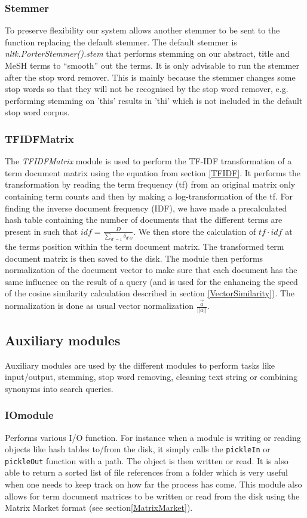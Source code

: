 \subsubsection{Stemmer}
To preserve flexibility our system allows another stemmer to be sent
to the function replacing the default stemmer. The default stemmer is
\textit{nltk.PorterStemmer().stem} that performs stemming on our
abstract, title and MeSH terms to ``smooth'' out the terms. It is only
advisable to run the stemmer after the stop word remover. This is
mainly because the stemmer changes some stop words so that they will
not be recognised by the stop word remover, e.g. performing stemming
on 'this' results in 'thi' which is not included in the default stop
word corpus.

\subsubsection{TFIDFMatrix}
The \textit{TFIDFMatrix} module is used to perform the TF-IDF
transformation of a term document matrix using the equation from
section \ref{TFIDF}. It performs the transformation by reading the
term frequency (tf) from an original matrix only containing term
counts and then by making a log-transformation of the tf. For finding
the inverse document frequency (IDF), we have made a precalculated
hash table containing the number of documents that the different terms
are present in such that $\mathit{idf} = \frac{D}{\sum_{d\prime =
    1}\delta_{d\prime w}}$. We then store the calculation of
$\mathit{tf} \cdot \mathit{idf}$ at the terms position within the term
document matrix. The transformed term document matrix is then saved to
the disk. The module then performs normalization of the document
vector to make sure that each document has the same influence on the
result of a query (and is used for the enhancing the speed of the
cosine similarity calculation described in section
\ref{VectorSimilarity}). The normalization is done as usual vector
normalization $\frac{\overrightarrow{a}}{||a||}$.

\subsection{Auxiliary modules\label{AuxModules}}

Auxiliary modules are used by the different modules to perform tasks
like input/output, stemming, stop word removing, cleaning text string
or combining synonyms into search queries.

\subsubsection{IOmodule}
Performs various I/O function. For instance when a module is writing
or reading objects like hash tables to/from the disk, it simply calls
the \texttt{pickleIn} or \texttt{pickleOut} function with a path. The
object is then written or read. It is also able to return a sorted
list of file references from a folder which is very useful when one
needs to keep track on how far the process has come. This module also
allows for term document matrices to be written or read from the disk
using the Matrix Market format (see section\ref{MatrixMarket}).


